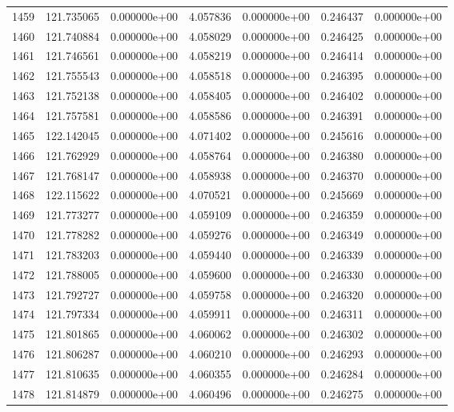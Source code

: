 \begin{tabular}{rrrrrrr}
1459 & 121.735065 &  0.000000e+00 &  4.057836 &  0.000000e+00 &    0.246437 &  0.000000e+00 \\
1460 & 121.740884 &  0.000000e+00 &  4.058029 &  0.000000e+00 &    0.246425 &  0.000000e+00 \\
1461 & 121.746561 &  0.000000e+00 &  4.058219 &  0.000000e+00 &    0.246414 &  0.000000e+00 \\
1462 & 121.755543 &  0.000000e+00 &  4.058518 &  0.000000e+00 &    0.246395 &  0.000000e+00 \\
1463 & 121.752138 &  0.000000e+00 &  4.058405 &  0.000000e+00 &    0.246402 &  0.000000e+00 \\
1464 & 121.757581 &  0.000000e+00 &  4.058586 &  0.000000e+00 &    0.246391 &  0.000000e+00 \\
1465 & 122.142045 &  0.000000e+00 &  4.071402 &  0.000000e+00 &    0.245616 &  0.000000e+00 \\
1466 & 121.762929 &  0.000000e+00 &  4.058764 &  0.000000e+00 &    0.246380 &  0.000000e+00 \\
1467 & 121.768147 &  0.000000e+00 &  4.058938 &  0.000000e+00 &    0.246370 &  0.000000e+00 \\
1468 & 122.115622 &  0.000000e+00 &  4.070521 &  0.000000e+00 &    0.245669 &  0.000000e+00 \\
1469 & 121.773277 &  0.000000e+00 &  4.059109 &  0.000000e+00 &    0.246359 &  0.000000e+00 \\
1470 & 121.778282 &  0.000000e+00 &  4.059276 &  0.000000e+00 &    0.246349 &  0.000000e+00 \\
1471 & 121.783203 &  0.000000e+00 &  4.059440 &  0.000000e+00 &    0.246339 &  0.000000e+00 \\
1472 & 121.788005 &  0.000000e+00 &  4.059600 &  0.000000e+00 &    0.246330 &  0.000000e+00 \\
1473 & 121.792727 &  0.000000e+00 &  4.059758 &  0.000000e+00 &    0.246320 &  0.000000e+00 \\
1474 & 121.797334 &  0.000000e+00 &  4.059911 &  0.000000e+00 &    0.246311 &  0.000000e+00 \\
1475 & 121.801865 &  0.000000e+00 &  4.060062 &  0.000000e+00 &    0.246302 &  0.000000e+00 \\
1476 & 121.806287 &  0.000000e+00 &  4.060210 &  0.000000e+00 &    0.246293 &  0.000000e+00 \\
1477 & 121.810635 &  0.000000e+00 &  4.060355 &  0.000000e+00 &    0.246284 &  0.000000e+00 \\
1478 & 121.814879 &  0.000000e+00 &  4.060496 &  0.000000e+00 &    0.246275 &  0.000000e+00 \\

\end{tabular}
